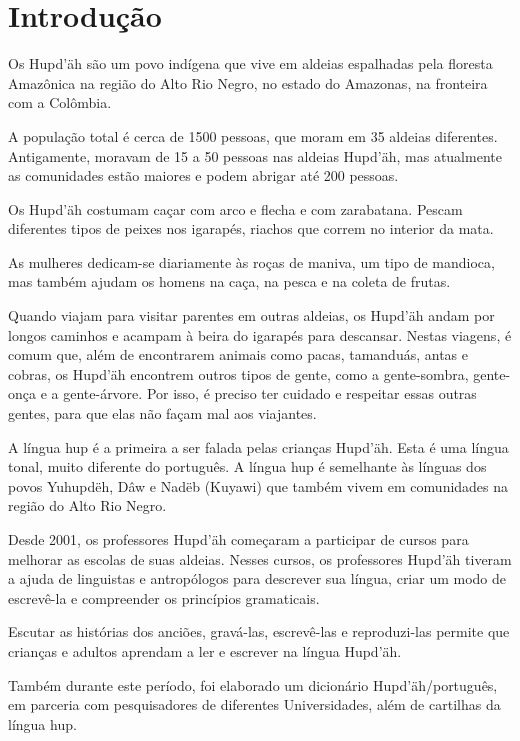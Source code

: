\chapter{Introdução}

Os Hupd’äh são um povo indígena que vive em aldeias espalhadas pela floresta Amazônica na região do Alto Rio Negro, no estado do Amazonas, na fronteira com a Colômbia.

A população total é cerca de 1500 pessoas, que moram em 35 aldeias diferentes. Antigamente, moravam de 15 a 50 pessoas nas aldeias Hupd’äh, mas atualmente as comunidades estão maiores e podem abrigar até 200 pessoas.

Os Hupd’äh costumam caçar com arco e flecha e com zarabatana. Pescam diferentes tipos de peixes nos igarapés, riachos que correm no interior da mata.

As mulheres dedicam-se diariamente às roças de maniva, um tipo de mandioca, mas também ajudam os homens na caça, na pesca e na coleta de frutas.

Quando viajam para visitar parentes em outras aldeias, os Hupd’äh andam por longos caminhos e acampam à beira do igarapés para descansar. Nestas viagens, é comum que, além de encontrarem animais como pacas, tamanduás, antas e cobras, os Hupd’äh encontrem outros tipos de gente, como a gente-sombra, gente-onça e a gente-árvore. Por isso, é preciso ter cuidado e respeitar essas outras gentes, para que elas não façam mal aos viajantes.

A língua hup é a primeira a ser falada pelas crianças Hupd’äh. Esta é uma língua tonal, muito
diferente do português. A língua hup é semelhante às línguas dos povos Yuhupdëh,
Dâw e Nadëb (Kuyawi) que também vivem em comunidades na região do Alto Rio Negro.

Desde 2001, os professores Hupd’äh começaram a participar de cursos para melhorar as
escolas de suas aldeias. Nesses cursos, os professores Hupd’äh tiveram a ajuda de linguistas e antropólogos para descrever sua língua, criar um modo de escrevê-la e compreender os princípios gramaticais.

Escutar as histórias dos anciões, gravá-las, escrevê-las e reproduzi-las permite que
crianças e adultos aprendam a ler e escrever na língua Hupd’äh.

Também durante este período, foi elaborado um dicionário Hupd’äh/português, em parceria
com pesquisadores de diferentes Universidades, além de cartilhas da língua hup.
